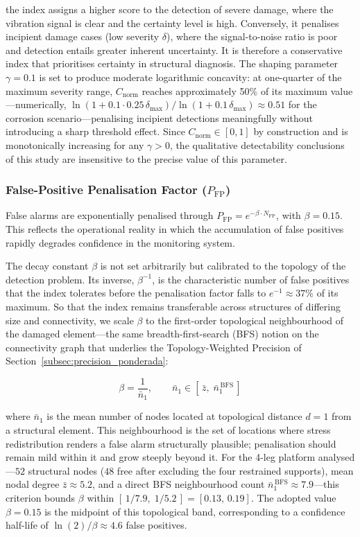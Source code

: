 \documentclass[preprint,12pt]{elsarticle}
\begin{document}
\noindent the index assigns a higher score to the detection of severe damage, where the vibration signal is clear and the certainty level is high. Conversely, it penalises incipient damage cases (low severity $\delta$), where the signal-to-noise ratio is poor and detection entails greater inherent uncertainty. It is therefore a conservative index that prioritises certainty in structural diagnosis. The shaping parameter $\gamma = 0.1$ is set to produce moderate logarithmic concavity: at one-quarter of the maximum severity range, $C_{\text{norm}}$ reaches approximately 50\% of its maximum value---numerically, $\ln(1+0.1\cdot0.25\,\delta_{\max})/\ln(1+0.1\,\delta_{\max})\approx 0.51$ for the corrosion scenario---penalising incipient detections meaningfully without introducing a sharp threshold effect. Since $C_{\text{norm}}\in[0,1]$ by construction and is monotonically increasing for any $\gamma>0$, the qualitative detectability conclusions of this study are insensitive to the precise value of this parameter.

\subsubsection{False-Positive Penalisation Factor (\texorpdfstring{$P_{\text{FP}}$}{Pfp})}
False alarms are exponentially penalised through $P_{\text{FP}} = e^{-\beta \cdot N_{\text{FP}}}$, with $\beta = 0.15$. This reflects the operational reality in which the accumulation of false positives rapidly degrades confidence in the monitoring system.

The decay constant $\beta$ is not set arbitrarily but calibrated to the topology of the detection problem. Its inverse, $\beta^{-1}$, is the characteristic number of false positives that the index tolerates before the penalisation factor falls to $e^{-1}\approx 37\%$ of its maximum. So that the index remains transferable across structures of differing size and connectivity, we scale $\beta$ to the first-order topological neighbourhood of the damaged element---the same breadth-first-search (BFS) notion on the connectivity graph that underlies the Topology-Weighted Precision of Section~\ref{subsec:precision_ponderada}:

\begin{equation}
    \label{eq:beta_calibration}
    \beta = \frac{1}{\bar{n}_1}, \qquad \bar{n}_1 \in \left[\,\bar{z},\; \bar{n}_1^{\,\text{BFS}}\,\right]
\end{equation}

\noindent where $\bar{n}_1$ is the mean number of nodes located at topological distance $d=1$ from a structural element. This neighbourhood is the set of locations where stress redistribution renders a false alarm structurally plausible; penalisation should remain mild within it and grow steeply beyond it. For the 4-leg platform analysed---$52$ structural nodes ($48$ free after excluding the four restrained supports), mean nodal degree $\bar{z}\approx 5.2$, and a direct BFS neighbourhood count $\bar{n}_1^{\,\text{BFS}}\approx 7.9$---this criterion bounds $\beta$ within $[\,1/7.9,\;1/5.2\,]=[0.13,\,0.19]$. The adopted value $\beta=0.15$ is the midpoint of this topological band, corresponding to a confidence half-life of $\ln(2)/\beta\approx 4.6$ false positives.
\end{document}
